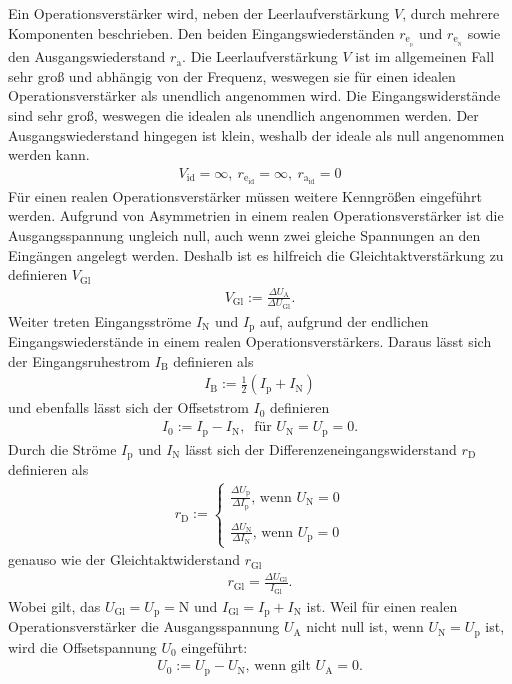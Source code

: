 Ein  Operationsverstärker wird, neben der Leerlaufverstärkung $V$, durch mehrere Komponenten beschrieben.
Den beiden Eingangswiederständen $r_{\text{e}_{{}_\text{p}}}$ und $r_{\text{e}_{{}_\text{N}}}$ sowie den Ausgangswiederstand $r_\text{a}$.
Die Leerlaufverstärkung $V$ ist im allgemeinen Fall sehr groß und abhängig von der Frequenz, weswegen sie für einen idealen Operationsverstärker als unendlich angenommen wird.
Die Eingangswiderstände sind sehr groß, weswegen die idealen als unendlich angenommen werden.
Der Ausgangswiederstand hingegen ist klein, weshalb der ideale als null angenommen werden kann.
\begin{align}
	V_\text{id}=\infty,~ r_{\text{e}_\text{id}}=\infty,~ r_{\text{a}_\text{id}}=0
\end{align}
Für einen realen Operationsverstärker müssen weitere Kenngrößen eingeführt werden.
Aufgrund von Asymmetrien in einem realen Operationsverstärker ist die Ausgangsspannung ungleich null, auch wenn zwei gleiche Spannungen an den Eingängen angelegt werden.
Deshalb ist es hilfreich die Gleichtaktverstärkung zu definieren $V_\text{Gl}$
\begin{align}
	V_\text{Gl}:=\frac{\Delta U_\text{A}}{\Delta U_\text{Gl}}.
\end{align}
Weiter treten Eingangsströme $I_\text{N}$ und $I_\text{p}$ auf, aufgrund der endlichen Eingangswiederstände in einem realen Operationsverstärkers.
Daraus lässt sich der Eingangsruhestrom $I_\text{B}$ definieren als
\begin{align}
	I_\text{B}:=\frac{1}{2}\left( I_\text{p} + I_\text{N} \right)
\end{align}
und ebenfalls lässt sich der Offsetstrom $I_0$ definieren
\begin{align}
	I_0:=I_\text{p}-I_\text{N},~ \text{ für }U_\text{N}=U_\text{p}=0.
\end{align}
Durch die Ströme $I_\text{p}$ und $I_\text{N}$ lässt sich der Differenzeneingangswiderstand $r_\text{D}$ definieren als
\begin{align}
	r_\text{D}:=
	\begin{cases}
		\frac{\Delta U_\text{p}}{\Delta I_\text{p}}\text{, wenn } U_\text{N}=0\\
		\\
		\frac{\Delta U_\text{N}}{\Delta I_\text{N}}\text{, wenn } U_\text{p}=0
	\end{cases}
\end{align}
genauso wie der Gleichtaktwiderstand $r_\text{Gl}$
\begin{align}
	r_\text{Gl}=\frac{\Delta U_\text{Gl}}{I_\text{Gl}}.
\end{align}
Wobei gilt, das $U_\text{Gl}=U_\text{p}=\text{N}$ und $I_\text{Gl}=I_\text{p}+I_\text{N}$ ist.
Weil für einen realen Operationsverstärker die Ausgangsspannung $U_\text{A}$ nicht null ist, wenn $U_\text{N}=U_\text{p}$ ist, wird die Offsetspannung $U_0$ eingeführt:
\begin{align}
	U_0:=U_\text{p}-U_\text{N}\text{, wenn gilt }U_\text{A}=0.
\end{align}
